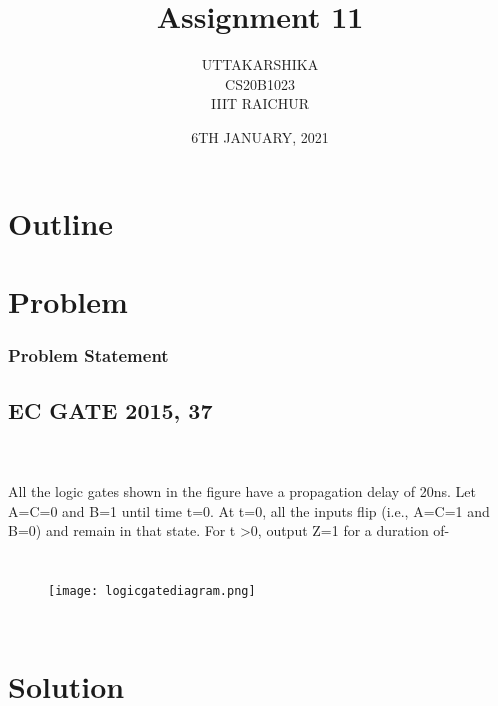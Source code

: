 \documentclass{beamer}
\title{Assignment 11}
\author{UTTAKARSHIKA\\CS20B1023\\IIIT RAICHUR}
\date{6TH JANUARY, 2021}
\theoremstyle{remark}
\numberwithin{equation}{section}
\begin{document}
\begin{frame}
\titlepage
\end{frame}

\section*{Outline}
\begin{frame}
\tableofcontents
\end{frame}
\section{Problem}
\begin{frame}
\frametitle{Problem Statement}
\subsection{EC GATE 2015, 37 }
%
\\
\\All the logic gates shown in the figure have a propagation delay of 20ns. Let A=C=0 and B=1 until time t=0. At t=0, all the inputs flip (i.e., A=C=1 and B=0) and remain in that state. For t \textgreater0, output Z=1 for a duration of-

 \begin{center}
\begin{columns}
\vspace{0.45cm} %
    \begin{figure}[h]
    \centering
   
        
    
    \scalebox{0.55} {\texttt{[image: logicgatediagram.png]}} 
    
    \label{fig:graph}
   
\end{figure}

\end{columns}
 \end{center}

\end{frame}


\section{Solution}
\end{document}
